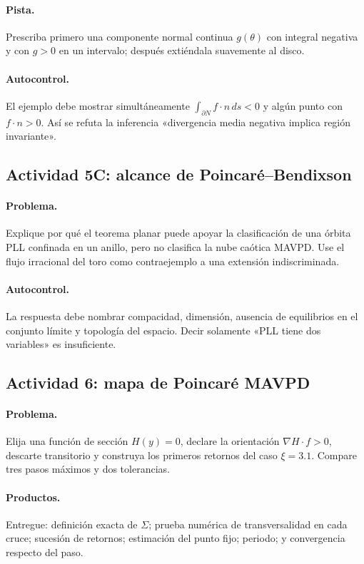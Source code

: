 \paragraph{Pista.}
Prescriba primero una componente normal continua \(g(\theta)\) con integral
negativa y con \(g>0\) en un intervalo; después extiéndala suavemente al disco.

\paragraph{Autocontrol.}
El ejemplo debe mostrar simultáneamente
\(\int_{\partial N}f\cdot n\,ds<0\) y algún punto con \(f\cdot n>0\). Así se
refuta la inferencia «divergencia media negativa implica región invariante».

\subsection{Actividad 5C: alcance de Poincaré--Bendixson}

\paragraph{Problema.}
Explique por qué el teorema planar puede apoyar la clasificación de una órbita
PLL confinada en un anillo, pero no clasifica la nube caótica MAVPD. Use el
flujo irracional del toro como contraejemplo a una extensión indiscriminada.

\paragraph{Autocontrol.}
La respuesta debe nombrar compacidad, dimensión, ausencia de equilibrios en el
conjunto límite y topología del espacio. Decir solamente «PLL tiene dos
variables» es insuficiente.

\subsection{Actividad 6: mapa de Poincaré MAVPD}

\paragraph{Problema.}
Elija una función de sección \(H(y)=0\), declare la orientación
\(\nabla H\cdot f>0\), descarte transitorio y construya los primeros retornos
del caso \(\xi=3.1\). Compare tres pasos máximos y dos tolerancias.

\paragraph{Productos.}
Entregue: definición exacta de \(\Sigma\); prueba numérica de transversalidad
en cada cruce; sucesión de retornos; estimación del punto fijo; periodo; y
convergencia respecto del paso.

